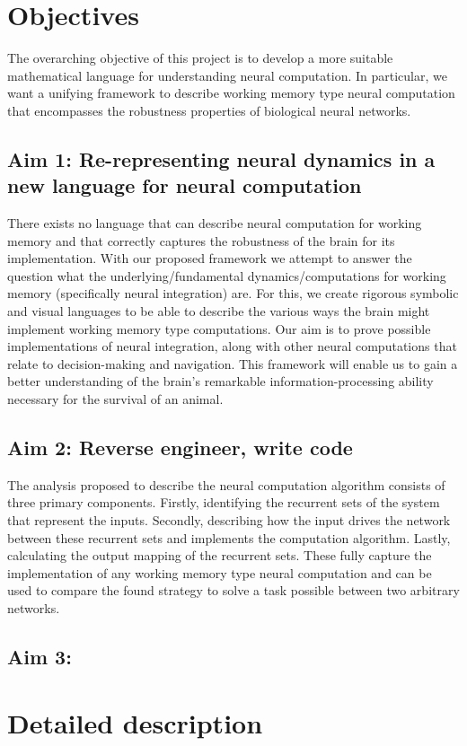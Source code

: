 \documentclass[12pt,letterpaper, onecolumn]{article}
\theoremstyle{definition}
\theoremstyle{remark}
\begin{document}
%



\section{Objectives}
The overarching objective of this project is to develop a more suitable mathematical language for understanding neural computation. In particular, we want a unifying framework to describe working memory type neural computation that encompasses the robustness properties of biological neural networks.

\subsection*{Aim 1: Re-representing neural dynamics in a new language for neural computation}
There exists no language that can describe neural computation for working memory and that  correctly captures the robustness of the brain for its implementation. With our proposed framework we attempt to answer the question what the underlying/fundamental dynamics/computations for working memory (specifically neural integration) are. For this, we create rigorous symbolic and visual languages to be able to describe the various ways the brain might implement working memory type computations. Our aim is to prove possible implementations of neural integration, along with other neural computations that relate to decision-making and navigation. This framework will enable us to gain a better understanding of the brain's remarkable information-processing ability necessary for the survival of an animal. 



\subsection*{Aim 2: Reverse engineer, write code}
The analysis proposed to describe the neural computation algorithm consists of three primary components. Firstly, identifying the recurrent sets of the system that represent the inputs. Secondly, describing how the input drives the network between these recurrent sets and implements the computation algorithm. Lastly, calculating the output mapping of the recurrent sets.
These fully capture the implementation of any working memory type neural computation and can be used to compare the found strategy to solve a task possible between two arbitrary networks.



\subsection*{Aim 3: }




\section{Detailed description}



\printbibliography
\end{document}
